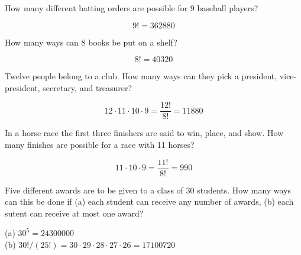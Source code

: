 \documentclass[11pt]{exam}
\begin{document}
\begin{questions}


\question How many different batting orders are possible for 9 baseball players?

\begin{solution}
\[
  9! = 362880
\]
\end{solution}



\question How many ways can 8 books be put on a shelf?

\begin{solution}
\[
  8! = 40320
\]
\end{solution}



\newpage


\question Twelve people belong to a club.  How many ways can they pick a
president, vice-president, secretary, and treasurer?

\begin{solution}
\[
  12 \cdot 11 \cdot 10 \cdot 9 = \frac{12!}{8!} = 11880
\]
\end{solution}



\question In a horse race the first three finishers are said to win, place, and
show.  How many finishes are possible for a race with 11 horses?

\begin{solution}
\[
  11 \cdot 10 \cdot 9 = \frac{11!}{8!} = 990
\]
\end{solution}



\question Five different awards are to be given to a class of 30 students.  How
many ways can this be done if (a) each student can receive any number of
awards, (b) each sutent can receive at most one award?

\begin{solution}
(a) $30^5 = 24300000$ \\
(b) $30!/(25!) = 30 \cdot 29 \cdot 28 \cdot 27 \cdot 26 = 17100720$
\end{solution}


\end{questions}
\end{document}
